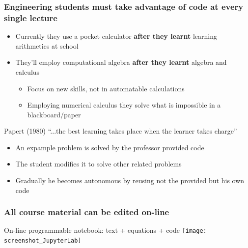 \documentclass[aspectratio=169]{beamer}
\begin{document}
\begin{frame}
	\frametitle{Engineering students must take advantage of code at every single lecture}
	\pause
	\begin{block}{}
		\begin{itemize}[<+->]
			\item Currently they use a pocket calculator \textbf{after they learnt} learning arithmetics at school
			\item They'll employ computational algebra \textbf{after they learnt} algebra and calculus
			\begin{itemize}[<+->]
				\item Focus on new skills, not in automatable calculations
				\item Employing numerical calculus they solve what is impossible in a blackboard/paper
			\end{itemize}
			\end{itemize}
	\end{block}
	\pause
	\begin{block}{}
		Papert (1980) ``...the best learning takes place when the learner takes charge''
		\begin{itemize}[<+->]
			\item An expample problem is solved by the professor provided code
			\item The student modifies it to solve other related problems
			\item Gradually he becomes autonomous by reusing not the provided but his own code
		\end{itemize}
	\end{block}
\end{frame}


\begin{frame}
	\frametitle{All course material can be edited on-line}
	\pause
	\begin{block}{On-line programmable notebook: text + equations + code}
		\texttt{[image: screenshot\_JupyterLab]}
	\end{block}
\end{frame}
\end{document}
